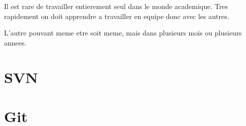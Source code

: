 Il est rare de travailler entierement seul dans le monde academique.
Tres rapidement on doit apprendre a travailler en equipe donc avec les autres.

L'autre pouvant meme etre soit meme, mais dans plusieurs mois ou plusieurs annees. 


\section{SVN}


\section{Git}

